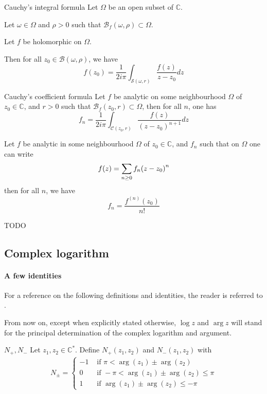 \documentclass[../main.tex]{subfiles}
\begin{document}
\begin{thm}{Cauchy's integral formula}\label{thm_cauchy_integral}
	Let $\Omega$ be an open subset of $\mathbb{C}$.
	
	Let $\omega \in \Omega$ and $\rho > 0$ such that
	$\mathcal{B}_f (\omega, \rho) \subset \Omega$.
	
	Let $f$ be holomorphic on $\Omega$.
	
	Then for all $z_0 \in \mathcal{B} (\omega, \rho)$, we have
	\begin{equation*}
		f(z_0) = \frac{1}{2 i \pi} \int_{\mathcal{S} (\omega, r)} \frac{f(z)}{z - z_0} dz
	\end{equation*}
\end{thm}

\begin{cor}{Cauchy's coefficient formula}\label{thm_cauchy_coefficients}
	Let $f$ be analytic on some neighbourhood $\Omega$ of $z_0 \in \mathbb{C}$, and $r > 0$ such that $\mathcal{B}_f (z_0, r) \subset \Omega$, then for all $n$, one has
	\[
	f_n = \frac{1}{2i\pi} \int_{\mathcal{C} (z_0, r)}
	\frac{f(z)}{{(z - z_0)}^{n+1}} dz
	\]
\end{cor}

\begin{thm}{}
	Let $f$ be analytic in some neighbourhood $\Omega$ of $z_0 \in \mathbb{C}$, and $f_n$ such that on $\Omega$ one can write
	$$
	f(z) = \sum\limits_{n \geq 0} f_n {(z - z_0)}^n
	$$
	then for all $n$, we have
	$$
	f_n = \frac{f^{(n)}(z_0)}{n!}
	$$
\end{thm}


TODO

\subsection{Complex logarithm}

\paragraph{A few identities}

For a reference on the following definitions and identities, the reader is referred to \cite{Brown1996}.

From now on, except when explicitly stated otherwise, $\log z$ and $\arg z$ will stand for the principal determination of the complex logarithm and argument.

\begin{definition}{{$N_+, N_-$}}
	Let $z_1, z_2 \in \mathbb{C}^*$. Define $N_+(z_1, z_2)$ and $N_-(z_1, z_2)$ with
	\begin{align*}
	N_\pm =
	\begin{cases}
	-1 &\text{ if } \pi < \arg (z_1) \pm \arg (z_2)\\
	0  &\text{ if } - \pi < \arg (z_1) \pm \arg (z_2) \leq \pi \\
	1  &\text{ if } \arg (z_1) \pm \arg (z_2) \leq -\pi
	\end{cases}
	\end{align*}
\end{definition}
\end{document}
